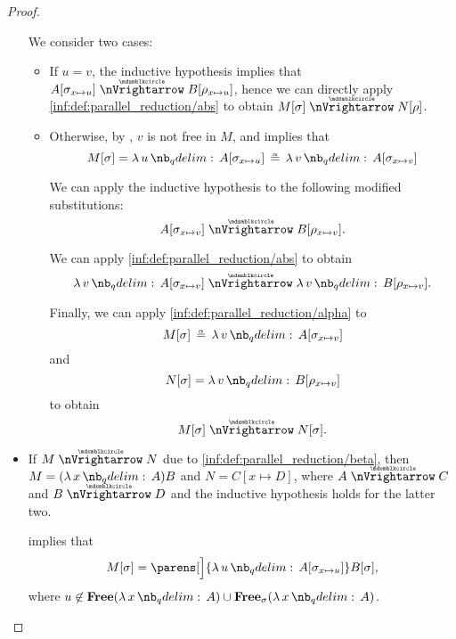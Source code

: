 \begin{proof}
\begin{itemize}
    We consider two cases:
    \begin{itemize}
      \item If \( u = v \), the inductive hypothesis implies that \( A[\sigma_{x \mapsto u}] \ppred B[\rho_{x \mapsto u}] \), hence we can directly apply \ref{inf:def:parallel_reduction/abs} to obtain \( M[\sigma] \ppred N[\rho] \).

      \item Otherwise, by , \( v \) is not free in \( M \), and  implies that
      \begin{equation*}
        M[\sigma]
        =
        \qabs u A[\sigma_{x \mapsto u}]
        \aequiv
        \qabs v A[\sigma_{x \mapsto v}]
      \end{equation*}

      We can apply the inductive hypothesis to the following modified substitutions:
      \begin{equation*}
        A[\sigma_{x \mapsto v}] \ppred B[\rho_{x \mapsto v}].
      \end{equation*}

      We can apply \ref{inf:def:parallel_reduction/abs} to obtain
      \begin{equation*}
        \qabs v A[\sigma_{x \mapsto v}] \ppred \qabs v B[\rho_{x \mapsto v}].
      \end{equation*}

      Finally, we can apply \ref{inf:def:parallel_reduction/alpha} to
      \begin{equation*}
        M[\sigma] \aequiv \qabs v A[\sigma_{x \mapsto v}]
      \end{equation*}
      and
      \begin{equation*}
        N[\sigma] = \qabs v B[\rho_{x \mapsto v}]
      \end{equation*}
      to obtain
      \begin{equation*}
        M[\sigma] \ppred N[\sigma].
      \end{equation*}
    \end{itemize}

    \item If \( M \ppred N \) due to \ref{inf:def:parallel_reduction/beta}, then \( M = (\qabs x A)B \) and \( N = C[x \mapsto D] \), where \( A \ppred C \) and \( B \ppred D \) and the inductive hypothesis holds for the latter two.

     implies that
    \begin{equation*}
      M[\sigma] = \parens[\Big]{ \qabs u A[\sigma_{x \mapsto u}] } B[\sigma],
    \end{equation*}
    where \( u \not\in \op*{Free}(\qabs x A) \cup \op*{Free}_\sigma(\qabs x A) \).


\end{itemize}
\end{proof}
